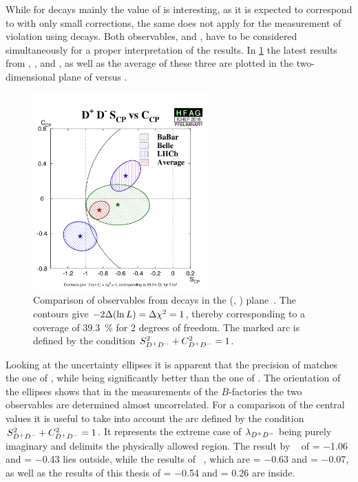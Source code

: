 While for \BdToJPsiKS decays mainly the value of \SJpsiKS is interesting, as
it is expected to correspond to \sintwobeta with only small corrections, the
same does not apply for the measurement of \CP violation using \BdToDD decays.
Both observables, \SDD and \CDD, have to be considered simultaneously for a
proper interpretation of the results. In \cref{fig:discussion:b2ddcomparison}
the latest results from \babar, \belle, and \lhcb, as well as the average of
these three are plotted in the two-dimensional plane of \CDD versus \SDD.
\begin{figure}[htb]
\centering
\includegraphics[width=0.6\textwidth]{08-Discussion/figs/D+D-S_CPvsC_CP.pdf}
\caption{Comparison of \CP observables from \mbox{\BdToDD} decays in the (\SDD,
\CDD) plane~\cite{HFAG}. The contours give $-2\Delta(\ln L) = \Delta\chi^2 =
1$, thereby corresponding to a coverage of \SI{39.3}{\percent} for 2 degrees
of freedom. The marked arc is defined by the condition $S_{{{D}^+}{{D}^-}}^2+C_{{{D}^+}{{D}^-}}^2=1$.}
\label{fig:discussion:b2ddcomparison}
\end{figure}
Looking at the uncertainty ellipses it is apparent that the precision of \lhcb
matches the one of \belle, while being significantly better than the one of
\babar. The orientation of the ellipses shows that in the measurements of the
$B$-factories the two \CP observables are determined almost uncorrelated. For
a comparison of the central values it is useful to take into account the arc
defined by the condition $S_{{{D}^+}{{D}^-}}^2+C_{{{D}^+}{{D}^-}}^2=1$. It represents the extreme case of
$\lambda_{{{D}^+}{{D}^-}}$ being purely imaginary and delimits the physically allowed
region. The result by \belle~\cite{Rohrken:2012ta} of \SDD = \num{-1.06} and
\CDD = \num{-0.43} lies outside, while the results of
\babar~\cite{Aubert:2008ah}, which are \SDD = \num{-0.63} and \CDD =
\num{-0.07}, as well as the results of this thesis of \SDD = \num{-0.54} and
\CDD = \num{0.26} are inside.
